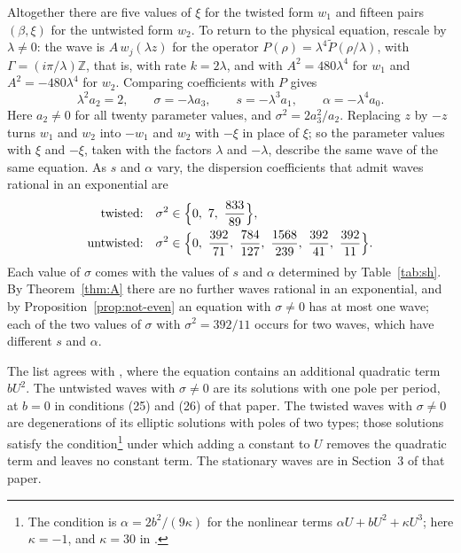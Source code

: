 \documentclass[11pt]{article}
\theoremstyle{definition}
\theoremstyle{remark}
\numberwithin{equation}{section}
\newcommand{\ZZ}{\mathbb Z}
\begin{document}
Altogether there are five values of \(\xi\) for the twisted form
\(w_1\) and fifteen pairs \((\beta,\xi)\) for the untwisted form
\(w_2\). To return to the physical equation, rescale by
\(\lambda\ne0\): the wave is
\(A\,w_j(\lambda z)\) for the operator
\(P(\rho)=\lambda^4\widetilde P(\rho/\lambda)\), with
\(\Gamma=(i\pi/\lambda)\ZZ\), that is, with rate \(k=2\lambda\), and with
\(A^2=480\lambda^4\) for \(w_1\) and \(A^2=-480\lambda^4\) for \(w_2\).
Comparing coefficients with \(P\) gives
\[
 \lambda^2a_2=2,\qquad \sigma=-\lambda a_3,\qquad
 s=-\lambda^3a_1,\qquad \alpha=-\lambda^4a_0 .
\]
Here \(a_2\ne0\) for all twenty parameter values, and
\(\sigma^2=2a_3^2/a_2\). Replacing \(z\) by \(-z\) turns \(w_1\) and
\(w_2\) into \(-w_1\) and \(w_2\) with \(-\xi\) in place of \(\xi\); so
the parameter values with \(\xi\) and \(-\xi\), taken with the factors
\(\lambda\) and \(-\lambda\), describe the same wave of the same
equation. As \(s\) and \(\alpha\) vary, the dispersion
coefficients that admit waves rational in an exponential are
\begin{equation}\label{eq:sh-sigma}
\begin{aligned}
 \text{twisted:}&\quad \sigma^2\in\Bigl\{0,\ 7,\ \frac{833}{89}\Bigr\},\\
  \text{untwisted:}&\quad \sigma^2\in\Bigl\{0,\ \frac{392}{71},\
 \frac{784}{127},\ \frac{1568}{239},\ \frac{392}{41},\
 \frac{392}{11}\Bigr\}.
\end{aligned}
\end{equation}
Each value of \(\sigma\) comes with the values of \(s\) and \(\alpha\)
determined by Table~\ref{tab:sh}. By Theorem~\ref{thm:A} there are no
further waves rational in an exponential, and by
Proposition~\ref{prop:not-even} an equation with \(\sigma\ne0\) has at
most one wave; each of the two values of \(\sigma\) with
\(\sigma^2=392/11\) occurs for two waves, which have different \(s\)
and \(\alpha\).

The list agrees with \citep{KudryashovSinelshchikov2012SH}, where the
equation contains an additional quadratic term \(bU^2\). The untwisted
waves with \(\sigma\ne0\) are its solutions with one pole per period,
at \(b=0\) in conditions (25) and (26) of that paper. The twisted waves
with \(\sigma\ne0\) are degenerations of its elliptic solutions with
poles of two types; those solutions satisfy the
condition\footnote{The condition is \(\alpha=2b^2/(9\kappa)\) for the
nonlinear terms \(\alpha U+bU^2+\kappa U^3\); here \(\kappa=-1\), and
\(\kappa=30\) in \citep{KudryashovSinelshchikov2012SH}.} under which
adding a constant to \(U\) removes the quadratic term and leaves no
constant term. The stationary waves are in Section~3 of that paper.
\end{document}
